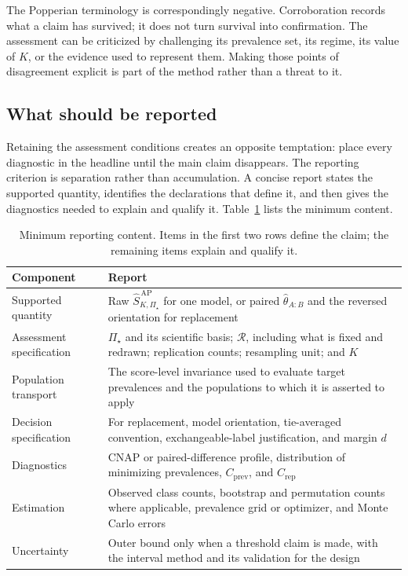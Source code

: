 \documentclass[11pt]{article}
\newcommand{\Regime}{\mathcal{R}}
\newcommand{\PSet}{\Pi_\star}
\newcommand{\SRobHat}{\widehat S_{K,\PSet}^{\,\mathrm{AP}}}
\theoremstyle{remark}
\begin{document}
The Popperian terminology is correspondingly negative. Corroboration records what a claim has survived; it does not turn survival into confirmation. The assessment can be criticized by challenging its prevalence set, its regime, its value of $K$, or the evidence used to represent them. Making those points of disagreement explicit is part of the method rather than a threat to it.

\subsection{What should be reported}

Retaining the assessment conditions creates an opposite temptation: place every diagnostic in the headline until the main claim disappears. The reporting criterion is separation rather than accumulation. A concise report states the supported quantity, identifies the declarations that define it, and then gives the diagnostics needed to explain and qualify it. Table~\ref{tab:reporting} lists the minimum content.

\begin{table}[ht]
\centering
\caption{Minimum reporting content. Items in the first two rows define the claim; the remaining items explain and qualify it.}
\label{tab:reporting}
\begin{tabularx}{\textwidth}{@{}p{}X@{}}
\toprule
Component & Report \\
\midrule
Supported quantity &
Raw $\SRobHat$ for one model, or paired $\widehat\theta_{A:B}$ and the reversed orientation for replacement \\
Assessment specification &
$\PSet$ and its scientific basis; $\Regime$, including what is fixed and redrawn; replication counts; resampling unit; and $K$ \\
Population transport &
The score-level invariance used to evaluate target prevalences and the populations to which it is asserted to apply \\
Decision specification &
For replacement, model orientation, tie-averaged convention, exchangeable-label justification, and margin $d$ \\
Diagnostics &
CNAP or paired-difference profile, distribution of minimizing prevalences, $C_{\mathrm{prev}}$, and $C_{\mathrm{rep}}$ \\
Estimation &
Observed class counts, bootstrap and permutation counts where applicable, prevalence grid or optimizer, and Monte Carlo errors \\
Uncertainty &
Outer bound only when a threshold claim is made, with the interval method and its validation for the design \\
\bottomrule
\end{tabularx}
\end{table}
\end{document}
